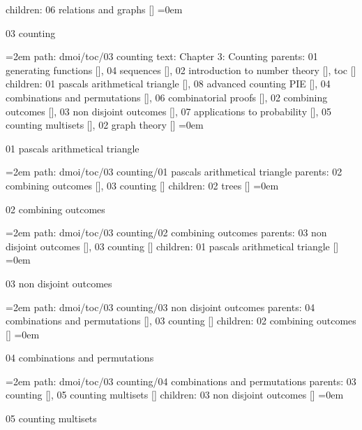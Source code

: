 \smallskip
children: 06 relations and graphs []
\smallskip
\leftskip=0em
\par\endgroup
\bigskip
{}
03 counting
\smallskip
\par\begingroup
\leftskip=2em
path: dmoi/toc/03 counting
\smallskip
text:  Chapter 3: Counting
\smallskip
parents:  01 generating functions [], 04 sequences [], 02 introduction to number theory [], toc []
\smallskip
children: 01 pascals arithmetical triangle [], 08 advanced counting PIE [], 04 combinations and permutations [], 06 combinatorial proofs [], 02 combining outcomes [], 03 non disjoint outcomes [], 07 applications to probability [], 05 counting multisets [], 02 graph theory []
\smallskip
\leftskip=0em
\par\endgroup
\bigskip
{}
01 pascals arithmetical triangle
\smallskip
\par\begingroup
\leftskip=2em
path: dmoi/toc/03 counting/01 pascals arithmetical triangle
\smallskip
parents:  02 combining outcomes [], 03 counting []
\smallskip
children: 02 trees []
\smallskip
\leftskip=0em
\par\endgroup
\bigskip
{}
02 combining outcomes
\smallskip
\par\begingroup
\leftskip=2em
path: dmoi/toc/03 counting/02 combining outcomes
\smallskip
parents:  03 non disjoint outcomes [], 03 counting []
\smallskip
children: 01 pascals arithmetical triangle []
\smallskip
\leftskip=0em
\par\endgroup
\bigskip
{}
03 non disjoint outcomes
\smallskip
\par\begingroup
\leftskip=2em
path: dmoi/toc/03 counting/03 non disjoint outcomes
\smallskip
parents:  04 combinations and permutations [], 03 counting []
\smallskip
children: 02 combining outcomes []
\smallskip
\leftskip=0em
\par\endgroup
\bigskip
{}
04 combinations and permutations
\smallskip
\par\begingroup
\leftskip=2em
path: dmoi/toc/03 counting/04 combinations and permutations
\smallskip
parents:  03 counting [], 05 counting multisets []
\smallskip
children: 03 non disjoint outcomes []
\smallskip
\leftskip=0em
\par\endgroup
\bigskip
{}
05 counting multisets
\smallskip

